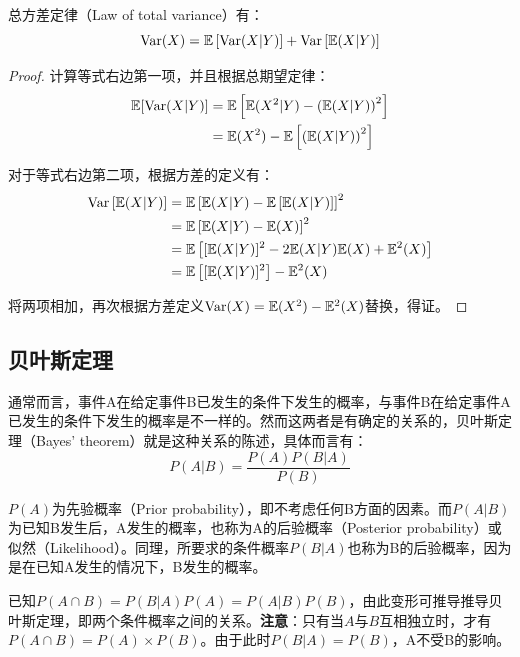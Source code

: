 \documentclass[11pt]{article}
\begin{document}
\begin{proposition}
    总方差定律（Law of total variance）有：
    \begin{equation*}
        \operatorname{Var}(X) = \mathbb{E}\left[ \operatorname{Var}(X|Y) \right] + \operatorname{Var}\left[ \mathbb{E}(X|Y) \right]
    \end{equation*}

    \begin{proof}
        计算等式右边第一项，并且根据总期望定律：
        \begin{align*}
            \mathbb{E}[\operatorname{Var}(X|Y)] &= \mathbb{E}\left[ \mathbb{E}(X^2|Y) - \left( \mathbb{E}(X|Y) \right)^2 \right] \\
            &= \mathbb{E}(X^2) - \mathbb{E}\left[ \left(\mathbb{E}(X|Y)\right)^2 \right]
        \end{align*}

        对于等式右边第二项，根据方差的定义有：
        \begin{align*}
            \operatorname{Var}\left[\mathbb{E}(X|Y)\right] &= \mathbb{E} \left[ \mathbb{E}(X|Y) - \mathbb{E}\left[ \mathbb{E}(X|Y) \right] \right]^2 \\
            &= \mathbb{E} \left[ \mathbb{E}(X|Y) - \mathbb{E}(X) \right]^2 \\
            &= \mathbb{E} \left[ [\mathbb{E}(X|Y)]^2 - 2\mathbb{E}(X|Y)\mathbb{E}(X) + \mathbb{E}^2(X) \right] \\
            &= \mathbb{E} \left[ [\mathbb{E}(X|Y)]^2 \right] - \mathbb{E}^2(X)
        \end{align*}
            
        将两项相加，再次根据方差定义$\operatorname{Var}(X) = \mathbb{E}(X^2) - \mathbb{E}^2(X)$替换，得证。
    \end{proof}
\end{proposition}

\subsection{贝叶斯定理}

通常而言，事件A在给定事件B已发生的条件下发生的概率，与事件B在给定事件A已发生的条件下发生的概率是不一样的。然而这两者是有确定的关系的，贝叶斯定理（Bayes' theorem）就是这种关系的陈述，具体而言有：
\begin{equation*}
    P(A|B) = \frac{P(A)P(B|A)}{P(B)}
\end{equation*}

$P(A)$为先验概率（Prior probability），即不考虑任何B方面的因素。而$P(A|B)$为已知B发生后，A发生的概率，也称为A的后验概率（Posterior probability）或似然（Likelihood）。同理，所要求的条件概率$P(B|A)$也称为B的后验概率，因为是在已知A发生的情况下，B发生的概率。

已知$P(A \cap B) = P(B|A)P(A) = P(A|B)P(B)$，由此变形可推导推导贝叶斯定理，即两个条件概率之间的关系。\textbf{注意}：只有当$A$与$B$互相独立时，才有$P(A \cap B) = P(A) \times P(B)$。由于此时$P(B|A) = P(B)$，A不受B的影响。
\end{document}
